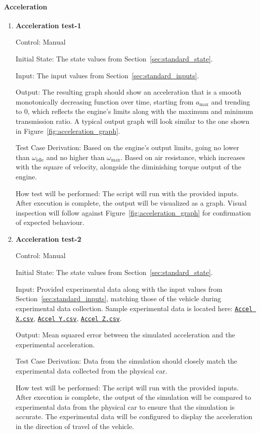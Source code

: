 \documentclass[12pt, titlepage]{article}
\newcommand{\refdata}[2]{
  \href{https://github.com/gr812b/CVT-Simulator/blob/main/experimental-data/#1
  }{\texttt{#2}}}
\begin{document}
\paragraph{Acceleration}

\begin{enumerate}

  \item {} \hypertarget{Acceleration test-1}{\textbf{Acceleration test-1}} \label{Acceleration test-1}
  
  Control: Manual
            
  Initial State: The state values from Section~\ref{sec:standard_state}.
  
  Input: The input values from Section~\ref{sec:standard_inputs}.
            
  Output: The resulting graph should show an acceleration that is a smooth monotonically decreasing function over time, starting from $a_\text{max}$ and trending to 0, which reflects the engine's limits along with the maximum and minimum transmission ratio. A typical output graph will look similar to the one shown in Figure~\ref{fig:acceleration_graph}.
  
  Test Case Derivation: Based on the engine's output limits, going no lower than $\omega_\text{idle}$ and no higher than $\omega_\text{max}$.
  Based on air resistance, which increases with the square of velocity, alongside the diminishing torque output of the engine.
  
  How test will be performed: The script will run with the provided inputs. After execution is complete, the output will be visualized as a graph. Visual inspection will follow against Figure~\ref{fig:acceleration_graph} for confirmation of expected behaviour.

  \item {} \hypertarget{Acceleration test-2}{\textbf{Acceleration test-2}} \label{Acceleration test-2}

  Control: Manual

  Initial State: The state values from Section~\ref{sec:standard_state}.

  Input: Provided experimental data along with the input values from Section~\ref{sec:standard_inputs}, matching those of the vehicle during experimental data collection. Sample experimental data is located here: \refdata{IMU\%20ACCEL\%20X.csv}{Accel X.csv}, \refdata{IMU\%20ACCEL\%20Y.csv}{Accel Y.csv}, \refdata{IMU\%20ACCEL\%20Z.csv}{Accel Z.csv}.

  Output: Mean squared error between the simulated acceleration and the experimental acceleration.

  Test Case Derivation: Data from the simulation should closely match the experimental data collected from the physical car.

  How test will be performed: The script will run with the provided inputs. After execution is complete, the output of the simulation will be compared to experimental data from the physical car to ensure that the simulation is accurate. The experimental data will be configured to display the acceleration in the direction of travel of the vehicle.

\end{enumerate}
\end{document}
